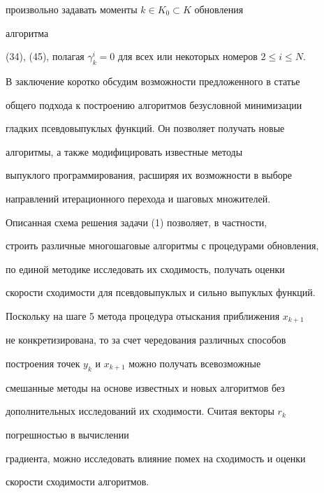 произвольно задавать моменты $k\in K_0\subset K$ обновления 


алгоритма


(34), (45), полагая $\gamma^i_k=0$ для всех или некоторых номеров $2\leq 


i\leq N$.





В заключение коротко обсудим возможности предложенного в статье 


общего подхода к построению алгоритмов безусловной минимизации


гладких псевдовыпуклых функций. Он позволяет получать новые 


алгоритмы, а также модифицировать известные методы


выпуклого программирования, расширяя их возможности в выборе 


направлений итерационного перехода и шаговых множителей. 


Описанная схема решения задачи (1) позволяет, в частности,


строить различные многошаговые алгоритмы с процедурами обновления,


по единой методике исследовать их сходимость, получать оценки 


скорости сходимости для псевдовыпуклых и сильно выпуклых функций.


Поскольку на шаге 5 метода процедура отыскания приближения $x_{k+1}$


не конкретизирована, то за счет чередования различных способов 


построения точек $y_k$ и $x_{k+1}$ можно получать всевозможные 


смешанные методы на основе известных и новых алгоритмов без 


дополнительных исследований их сходимости. Считая векторы $r_k$ 


погрешностью в вычислении


градиента, можно исследовать влияние помех на сходимость и оценки


скорости сходимости алгоритмов. 





